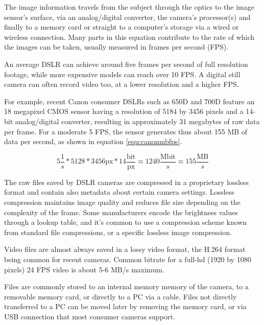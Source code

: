 
The image information travels from the subject through the optics to the image sensor's surface, via an analog/digital converter, the camera's processor(s) and finally to a memory card or straight to a computer's storage via a wired or wireless connection.
Many parts in this equation contribute to the rate of which the images can be taken, usually measured in frames per second (FPS).


An average DSLR can achieve around five frames per second of full resolution footage, while more expensive models can reach over 10 FPS.
A digital still camera can often record video too, at a lower resolution and a higher FPS.


For example, recent Canon consumer DSLRs such as 650D and 700D feature an 18 megapixel CMOS sensor having a resolution of 5184 by 3456 pixels and a 14-bit analog/digital converter, resulting in approximately 31 megabytes of raw data per frame.
For a moderate 5 FPS, the sensor generates thus about 155 MB of data per second, as shown in equation \ref{equ:canonmbfps}.

\begin{equation}
	5\frac{1}{s} * 5128 * 3456 \text{px} * 14 \frac{\text{bit}}{\text{px}} \approx 1240 \frac{\text{Mbit}}{s} \approx 155 \frac{\text{MB}}{s}
\end{equation}


The raw files saved by DSLR cameras are compressed in a proprietary lossless format and contain also metadata about certain camera settings.
Lossless compression maintains image quality and reduces file size depending on the complexity of the frame.
Some manufacturers encode the brightness values through a lookup table, and it's common to use a compression scheme known from standard file compressions, or a specific lossless image compression.

Video files are almost always saved in a lossy video format, the H.264 format being common for recent cameras.
Common bitrate for a full-hd (1920 by 1080 pixels) 24 FPS video is about 5-6 MB/s maximum.


Files are commonly stored to an internal memory memory of the camera, to a removable memory card, or directly to a PC via a cable.
Files not directly transferred to a PC can be moved later by removing the memory card, or via USB connection that most consumer cameras support.

